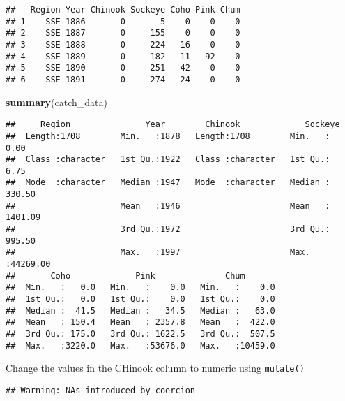 \documentclass[]{article}
\newenvironment{Shaded}{\begin{snugshade}}{\end{snugshade}}
\newcommand{\DataTypeTok}[1]{\textcolor[rgb]{0.13,0.29,0.53}{#1}}
\newcommand{\KeywordTok}[1]{\textcolor[rgb]{0.13,0.29,0.53}{\textbf{#1}}}
\newcommand{\NormalTok}[1]{#1}
\newcommand{\OperatorTok}[1]{\textcolor[rgb]{0.81,0.36,0.00}{\textbf{#1}}}
\newcommand{\StringTok}[1]{\textcolor[rgb]{0.31,0.60,0.02}{#1}}
\begin{document}
\begin{verbatim}
##   Region Year Chinook Sockeye Coho Pink Chum
## 1    SSE 1886       0       5    0    0    0
## 2    SSE 1887       0     155    0    0    0
## 3    SSE 1888       0     224   16    0    0
## 4    SSE 1889       0     182   11   92    0
## 5    SSE 1890       0     251   42    0    0
## 6    SSE 1891       0     274   24    0    0
\end{verbatim}

\begin{Shaded}
\begin{Highlighting}[]
\KeywordTok{summary}\NormalTok{(catch_data)}
\end{Highlighting}
\end{Shaded}

\begin{verbatim}
##     Region               Year        Chinook             Sockeye        
##  Length:1708        Min.   :1878   Length:1708        Min.   :    0.00  
##  Class :character   1st Qu.:1922   Class :character   1st Qu.:    6.75  
##  Mode  :character   Median :1947   Mode  :character   Median :  330.50  
##                     Mean   :1946                      Mean   : 1401.09  
##                     3rd Qu.:1972                      3rd Qu.:  995.50  
##                     Max.   :1997                      Max.   :44269.00  
##       Coho             Pink              Chum        
##  Min.   :   0.0   Min.   :    0.0   Min.   :    0.0  
##  1st Qu.:   0.0   1st Qu.:    0.0   1st Qu.:    0.0  
##  Median :  41.5   Median :   34.5   Median :   63.0  
##  Mean   : 150.4   Mean   : 2357.8   Mean   :  422.0  
##  3rd Qu.: 175.0   3rd Qu.: 1622.5   3rd Qu.:  507.5  
##  Max.   :3220.0   Max.   :53676.0   Max.   :10459.0
\end{verbatim}

Change the values in the CHinook column to numeric using
\texttt{mutate()}

\begin{Shaded}
\end{Shaded}

\begin{verbatim}
## Warning: NAs introduced by coercion
\end{verbatim}
\end{document}
